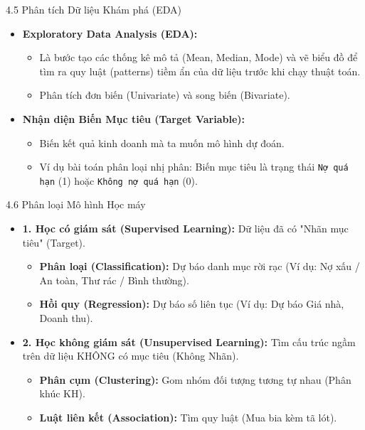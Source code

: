 \documentclass[aspectratio=169]{beamer}
\begin{document}
\begin{frame}{4.5 Phân tích Dữ liệu Khám phá (EDA)}
    \begin{itemize}
        \item \textbf{Exploratory Data Analysis (EDA):} 
        \begin{itemize}
            \item Là bước tạo các thống kê mô tả (Mean, Median, Mode) và vẽ biểu đồ để tìm ra quy luật (patterns) tiềm ẩn của dữ liệu trước khi chạy thuật toán.
            \item Phân tích đơn biến (Univariate) và song biến (Bivariate).
        \end{itemize}
        \item \textbf{Nhận diện Biến Mục tiêu (Target Variable):}
        \begin{itemize}
            \item Biến kết quả kinh doanh mà ta muốn mô hình dự đoán. 
            \item Ví dụ bài toán phân loại nhị phân: Biến mục tiêu là trạng thái \texttt{Nợ quá hạn} (1) hoặc \texttt{Không nợ quá hạn} (0).
        \end{itemize}
    \end{itemize}
\end{frame}

\begin{frame}{4.6 Phân loại Mô hình Học máy}
    \begin{itemize}
        \item \textbf{1. Học có giám sát (Supervised Learning):} Dữ liệu đã có "Nhãn mục tiêu" (Target).
        \begin{itemize}
            \item \textbf{Phân loại (Classification):} Dự báo danh mục rời rạc (Ví dụ: Nợ xấu / An toàn, Thư rác / Bình thường).
            \item \textbf{Hồi quy (Regression):} Dự báo số liên tục (Ví dụ: Dự báo Giá nhà, Doanh thu).
        \end{itemize}
        \item \textbf{2. Học không giám sát (Unsupervised Learning):} Tìm cấu trúc ngầm trên dữ liệu KHÔNG có mục tiêu (Không Nhãn).
        \begin{itemize}
            \item \textbf{Phân cụm (Clustering):} Gom nhóm đối tượng tương tự nhau (Phân khúc KH).
            \item \textbf{Luật liên kết (Association):} Tìm quy luật (Mua bia kèm tã lót).
        \end{itemize}
    \end{itemize}
\end{frame}
\end{document}
